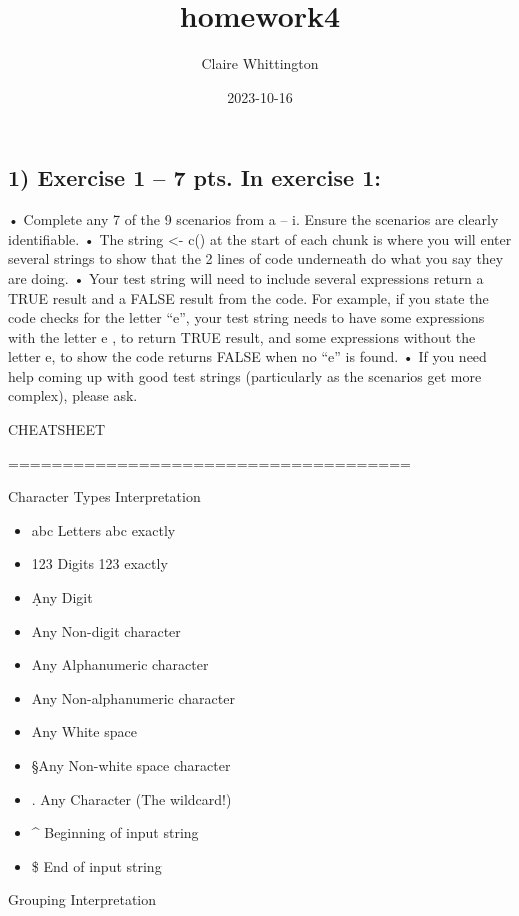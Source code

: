 \documentclass[
]{article}
\title{homework4}
\author{Claire Whittington}
\date{2023-10-16}
\begin{document}
\maketitle

\hypertarget{exercise-1-7-pts.-in-exercise-1}{%
\subsection{1) Exercise 1 -- 7 pts. In exercise
1:}\label{exercise-1-7-pts.-in-exercise-1}}

• Complete any 7 of the 9 scenarios from a -- i. Ensure the scenarios
are clearly identifiable. • The string \textless- c() at the start of
each chunk is where you will enter several strings to show that the 2
lines of code underneath do what you say they are doing. • Your test
string will need to include several expressions return a TRUE result and
a FALSE result from the code. For example, if you state the code checks
for the letter ``e'', your test string needs to have some expressions
with the letter e , to return TRUE result, and some expressions without
the letter e, to show the code returns FALSE when no ``e'' is found. •
If you need help coming up with good test strings (particularly as the
scenarios get more complex), please ask.

CHEATSHEET

=====================================

Character Types Interpretation

\begin{itemize}
\item
  abc Letters abc exactly
\item
  123 Digits 123 exactly
\item
  \d    Any Digit
\item
  \D    Any Non-digit character
\item
  \w    Any Alphanumeric character
\item
  \W    Any Non-alphanumeric character
\item
  \s    Any White space
\item
  \S    Any Non-white space character
\item
  . Any Character (The wildcard!)
\item
  \^{} Beginning of input string
\item
  \$ End of input string
\end{itemize}

Grouping Interpretation
\end{document}
